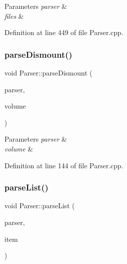 \begin{DoxyParams}{Parameters}
{\em parser} & \\
\hline
{\em files} & \\
\hline
\end{DoxyParams}


Definition at line 449 of file Parser.\+cpp.

\mbox{\label{namespace_parser_ae09396fa6fb2bb95523073e4bdfc4969}} 
\subsubsection{\texorpdfstring{parse\+Dismount()}{parseDismount()}}
{\footnotesize\ttfamily void Parser\+::parse\+Dismount (\begin{DoxyParamCaption}\item[{Q\+Command\+Line\+Parser \&}]{parser,  }\item[{Q\+Shared\+Pointer$<$ \hyperlink{struct_gost_crypt_1_1_core_1_1_dismount_volume_request}{Gost\+Crypt\+::\+Core\+::\+Dismount\+Volume\+Request} $>$}]{volume }\end{DoxyParamCaption})}


\begin{DoxyParams}{Parameters}
{\em parser} & \\
\hline
{\em volume} & \\
\hline
\end{DoxyParams}


Definition at line 144 of file Parser.\+cpp.

\mbox{\label{namespace_parser_aa78b1b9475d7b6183c16d4abd6a2ab0f}} 
\subsubsection{\texorpdfstring{parse\+List()}{parseList()}}
{\footnotesize\ttfamily void Parser\+::parse\+List (\begin{DoxyParamCaption}\item[{Q\+Command\+Line\+Parser \&}]{parser,  }\item[{\hyperlink{namespace_parser_a1f62f98026c9b835ba6b9a3210a25b8b}{Parser\+::\+What\+To\+List} $\ast$}]{item }\end{DoxyParamCaption})}


